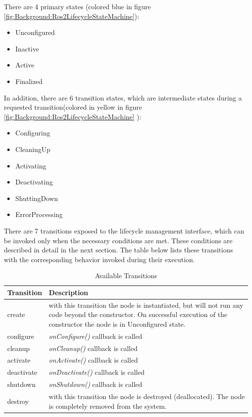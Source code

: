 	There are 4 primary states (colored blue in figure \ref{fig:Background:Ros2LifecycleStateMachine}):
	\begin{itemize}
		\item Unconfigured
		\item Inactive
		\item Active
		\item Finalized
	\end{itemize}
	In addition, there are 6 transition states, which are intermediate states during a requested transition(colored in yellow in figure \ref{fig:Background:Ros2LifecycleStateMachine} ):
	\begin{itemize}
		\item Configuring
		\item CleaningUp
		\item Activating
		\item Deactivating
		\item ShuttingDown
		\item ErrorProcessing
	\end{itemize}
	There are 7 transitions exposed to the lifecycle management interface, which can be invoked only when the necessary conditions are met. These conditions are described in detail in the next section. The table below lists these transitions with the corresponding behavior invoked during their execution.
	\begin{table}[H]
		\centering
		\caption{Available Transitions}
		\label{tab:Valid transitions}
		\begin{tabular}{|p{2cm}|p{9cm}|}
			\toprule
			Transition & Description\\
			\midrule
			create & with this transition the node is instantiated, but will not run any code beyond the constructor. On successful execution of the constructor the node is in Unconfigured state. \\
			configure & \textit{onConfigure()} callback is called\\
			cleanup & \textit{onCleanup()} callback is called\\
			activate & \textit{onActivate()} callback is called\\
			deactivate & \textit{onDeactivate()} callback is called\\
			shutdown & \textit{onShutdown()} callback is called\\
			destroy & with this transition the node is destroyed (deallocated). The node is completely removed from the system. \\
			\bottomrule
		\end{tabular}
	\end{table}

